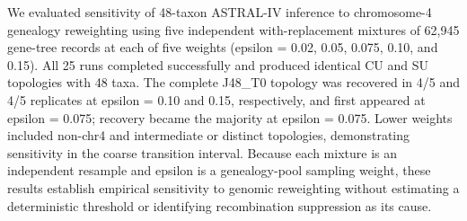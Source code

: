 We evaluated sensitivity of 48-taxon ASTRAL-IV inference to chromosome-4 genealogy reweighting using five independent with-replacement mixtures of 62,945 gene-tree records at each of five weights (epsilon = 0.02, 0.05, 0.075, 0.10, and 0.15). All 25 runs completed successfully and produced identical CU and SU topologies with 48 taxa. The complete J48_T0 topology was recovered in 4/5 and 4/5 replicates at epsilon = 0.10 and 0.15, respectively, and first appeared at epsilon = 0.075; recovery became the majority at epsilon = 0.075. Lower weights included non-chr4 and intermediate or distinct topologies, demonstrating sensitivity in the coarse transition interval. Because each mixture is an independent resample and epsilon is a genealogy-pool sampling weight, these results establish empirical sensitivity to genomic reweighting without estimating a deterministic threshold or identifying recombination suppression as its cause.
